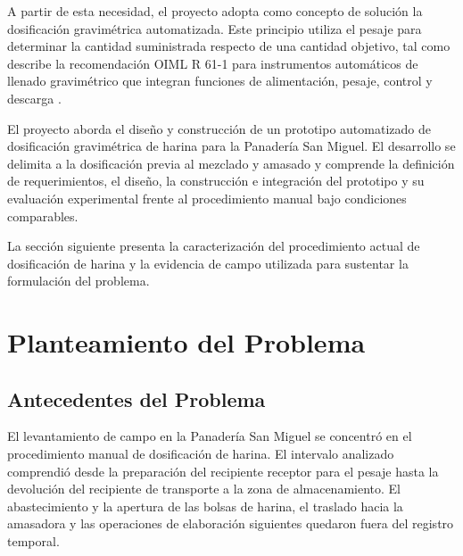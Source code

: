 A partir de esta necesidad, el proyecto adopta como concepto de solución
la dosificación gravimétrica automatizada. Este principio utiliza el
pesaje para determinar la cantidad suministrada respecto de una cantidad
objetivo, tal como describe la recomendación OIML R 61-1 para
instrumentos automáticos de llenado gravimétrico que integran funciones
de alimentación, pesaje, control y descarga \parencite{oiml2017r61}.

El proyecto aborda el diseño y construcción de un prototipo automatizado
de dosificación gravimétrica de harina para la Panadería San Miguel. El
desarrollo se delimita a la dosificación previa al mezclado y amasado y
comprende la definición de requerimientos, el diseño, la construcción e
integración del prototipo y su evaluación experimental frente al
procedimiento manual bajo condiciones comparables.

La sección siguiente presenta la caracterización del procedimiento actual
de dosificación de harina y la evidencia de campo utilizada para sustentar
la formulación del problema.


\section{Planteamiento del Problema}
\label{sec:problema}


\subsection{Antecedentes del Problema}
\label{subsec:antecedentes_problema}

El levantamiento de campo en la Panadería San Miguel se concentró en el
procedimiento manual de dosificación de harina. El intervalo analizado
comprendió desde la preparación del recipiente receptor para el pesaje
hasta la devolución del recipiente de transporte a la zona de
almacenamiento. El abastecimiento y la apertura de las bolsas de harina,
el traslado hacia la amasadora y las operaciones de elaboración siguientes
quedaron fuera del registro temporal.

